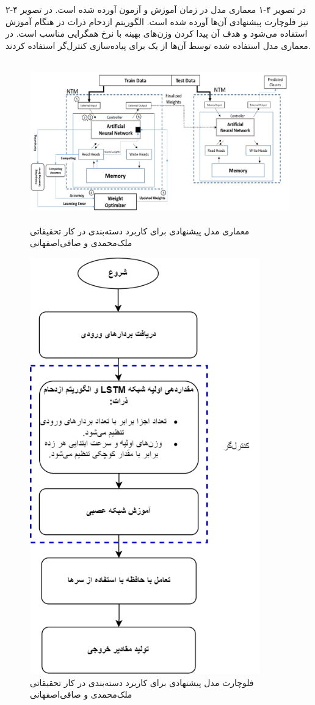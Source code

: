 در تصویر ۴-۱ معماری مدل در زمان آموزش و آزمون آورده شده است. در تصویر ۴-۲ نیز فلوچارت پیشنهادی آن‌ها آورده شده است. الگوریتم ازدحام ذرات در هنگام آموزش استفاده می‌شود و هدف آن پیدا کردن وزن‌های بهینه با نرخ همگرایی مناسب است. در معماری مدل استفاده شده توسط آن‌ها از یک  برای پیاده‌سازی کنترل‌گر استفاده کردند.\cite{faradonbe2020classifier}

\begin{figure}[!h]
\begin{center}
\includegraphics[height=7cm]{PSO-NTM-2.png}
\end{center}
\caption{معماری مدل پیشنهادی برای کاربرد دسته‌بندی در کار تحقیقاتی ملک‌محمدی و صافی‌اصفهانی \cite{faradonbe2020classifier}} 
\end{figure}

\begin{figure}[!h]
\begin{center}
\includegraphics[height=18cm]{PSO-NTM.png}
\end{center}
\caption{فلوچارت مدل پیشنهادی برای کاربرد دسته‌بندی در کار تحقیقاتی ملک‌محمدی و صافی‌اصفهانی \cite{faradonbe2020classifier}} 
\end{figure}